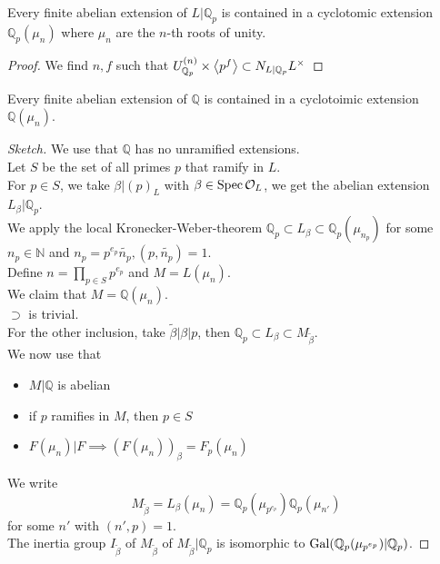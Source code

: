 \documentclass[../main.tex]{subfiles}
\begin{document}
\begin{crly}
Every finite abelian extension of $ L|\mathbb{Q}_p$ is contained in a cyclotomic extension $ \mathbb{Q}_p( \mu_n) $ where $\mu_n$ are the $n$-th roots of unity.
\end{crly}
\begin{proof}
	We find $n,f$ such that $U^{( n) }_{\mathbb{Q}_p} \times \left\langle p^{f}\right\rangle \subset N_{L| \mathbb{Q}_p} L^{\times}$ 
\end{proof}
\begin{thm}
Every finite abelian extension of $ \mathbb{Q}$ is contained in a cyclotoimic extension $ \mathbb{Q}( \mu_n) $.
\end{thm}
\begin{proof}[Sketch]
We use that $ \mathbb{Q}$ has no unramified extensions.\\
Let $S$ be the set of all primes $p$ that ramify in $L$.\\
For $p\in S$, we take $ \beta| ( p)_L$ with $\beta\in \operatorname{Spec} \mathcal{O}_L$, we get the abelian extension $L_{\beta} | \mathbb{Q}_p$.\\
We apply the local Kronecker-Weber-theorem $ \mathbb{Q}_p \subset L_{\beta} \subset \mathbb{Q}_p( \mu_{n_p} ) $ for some $n_p \in \mathbb{N}$ and $ n_p = p^{e_p}\tilde{n_p}, ( p, \tilde{n_p}) =1$.\\
Define $n= \prod_{p \in S} p^{e_p}$ and $M= L( \mu_n) $.\\
We claim that $M= \mathbb{Q}( \mu_n) $.\\
$\supset$ is trivial.\\
For the other inclusion, take $ \tilde\beta | \beta | p$, then $ \mathbb{Q}_p \subset L_\beta \subset M_{\tilde\beta} $.\\
We now use that
\begin{itemize}
\item $M| \mathbb{Q}$ is abelian
\item if $p$ ramifies in $M$, then $p \in S$
\item $F( \mu_n) |F \implies ( F( \mu_n) )_{\beta} = F_p( \mu_n) $ 	
\end{itemize}
We write
\[ 
M_{\tilde\beta} = L_\beta( \mu_n) = \mathbb{Q}_p( \mu_{p^{e_p}} ) \mathbb{Q}_p( \mu_{n'} ) 
\]
for some $n'$ with $( n',p) =1$.\\
The inertia group $I_{\tilde\beta} $ of $M_{\tilde\beta} $ of $M_{\tilde\beta} | \mathbb{Q}_p$ is isomorphic to $ \operatorname{Gal}( \mathbb{Q}_p( \mu_{p^{e_p}} ) | \mathbb{Q}_p) $.
\end{proof}
\end{document}
